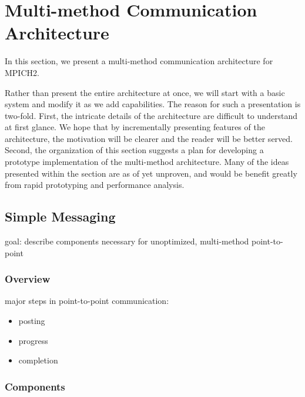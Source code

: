 \section{Multi-method Communication Architecture}

In this section, we present a multi-method communication architecture
for MPICH2.

Rather than present the entire architecture at once, we will start
with a basic system and modify it as we add capabilities.  The reason
for such a presentation is two-fold.  First, the intricate details of
the architecture are difficult to understand at first glance.  We hope
that by incrementally presenting features of the architecture, the
motivation will be clearer and the reader will be better served.
Second, the organization of this section suggests a plan for
developing a prototype implementation of the multi-method
architecture.  Many of the ideas presented within the section are as
of yet unproven, and would be benefit greatly from rapid prototyping
and performance analysis.




\subsection{Simple Messaging}

goal: describe components necessary for unoptimized, multi-method
point-to-point


\subsubsection{Overview}

major steps in point-to-point communication:
\begin{itemize}
\item posting
\item progress
\item completion
\end{itemize}


\subsubsection{Components}

